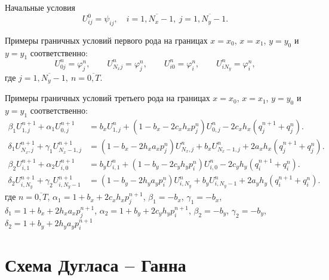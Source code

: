 \documentclass[a4paper,12pt]{article}
\begin{document}
Начальные условия
\begin{equation*}
  U^0_{ij} = \psi_{ij}, \quad i = \overline {1, N_x-1}, \ j = \overline {1, N_y-1}.
\end{equation*}

Примеры граничных условий первого рода на границах $x = x_0$, $x = x_1$, $y = y_0$ и $y = y_1$ соответственно:
\begin{equation*}
  U^n_{0j} = \varphi_j^n, \qquad U^n_{N_x j} = \varphi_j^n, \qquad  U^n_{i0} = \varphi_i^n, \qquad U^n_{i N_y} = \varphi_i^n,
\end{equation*}
где $j = \overline {1, N_y-1}, \ n = \overline{0,T}$.

Примеры граничных условий третьего рода на границах $x = x_0$, $x = x_1$, $y = y_0$ и $y = y_1$ соответственно:
\begin{align*}
  \beta_1 U^{n+1}_{1,j} + \alpha_1 U^{n+1}_{0,j} &=
  b_x U^{n}_{1,j} + \left(1 - b_x - 2 c_x h_x p^{n}_j \right) U^{n}_{0,j} - 2 c_x h_x (q_j^{n+1} + q_j^{n}). \\
  \delta_1 U^{n+1}_{N_x,j} + \gamma_1 U^{n+1}_{N_x-1,j}  &= \left(1 - b_x - 2 h_x a_x p^{n}_j \right) U^{n}_{N_x,j} + b_x U^{n}_{N_x-1,j} + 2 a_x h_x \left( q_j^{n+1} + q_j^{n} \right). \\
  \beta_2 U^{n+1}_{i,1} + \alpha_2 U^{n+1}_{i,0} &=
  b_y U^{n}_{i,1} + \left(1 - b_y - 2 c_y h_y p^{n}_i \right) U^{n}_{i,0} - 2 c_y h_y (q_i^{n+1} + q_i^{n}). \\
  \delta_2 U^{n+1}_{i,N_y} + \gamma_2 U^{n+1}_{i,N_y-1} &= \left(1 - b_y - 2 h_y a_y p^{n}_i \right) U^{n}_{i,N_y} + b_y U^{n}_{i,N_y-1} + 2 a_y h_y \left( q_i^{n+1} + q_i^{n} \right).
\end{align*}
где $n = \overline{0,T}$, $\alpha_1 =  1 + b_x  + 2 c_x h_x p^{n+1}_j$, $ \beta_1 = -b_x$, $\gamma_1 = -b_x$, $\delta_1 = 1 + b_x + 2 h_x a_x p^{n+1}_j$, $\alpha_2 = 1 + b_y  + 2 c_y h_y p^{n+1}_i $, $ \beta_2 = - b_y$, $\gamma_2 = -b_y$, $\delta_2 = 1 + b_y + 2 h_y a_y p^{n+1}_i$

\hrulefill

\section{Схема Дугласа -- Ганна}
\label{sec:heat3d}
\end{document}
